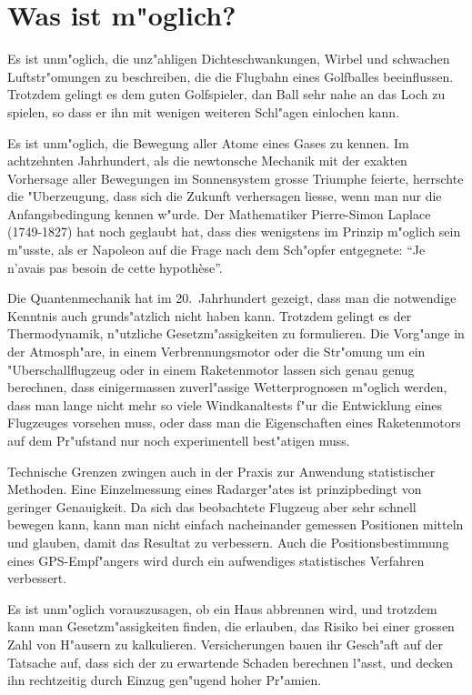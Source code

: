 \section*{Was ist m"oglich?}
Es ist unm"oglich, die unz"ahligen Dichteschwankungen, Wirbel und
schwachen Luftstr"omungen zu beschreiben, die die Flugbahn eines
Golfballes beeinflussen. Trotzdem gelingt es dem guten Golfspieler,
dan Ball sehr nahe an das Loch zu spielen, so dass er ihn mit wenigen
weiteren Schl"agen einlochen kann.

Es ist unm"oglich, die Bewegung aller Atome eines Gases zu kennen.
Im achtzehnten Jahrhundert, als die newtonsche Mechanik mit der
exakten Vorhersage aller Bewegungen im Sonnensystem grosse Triumphe
feierte, herrschte die "Uberzeugung, dass sich die Zukunft verhersagen
liesse, wenn man nur die Anfangsbedingung kennen w"urde.
Der Mathematiker Pierre-Simon Laplace (1749-1827) hat noch geglaubt hat, dass dies
wenigstens im Prinzip m"oglich sein m"usste, als er Napoleon auf die Frage
nach dem Sch"opfer entgegnete: ``Je n'avais pas besoin de cette hypoth\`ese''.

Die Quantenmechanik hat
im 20.~Jahrhundert gezeigt, dass man die notwendige Kenntnis auch
grunds"atzlich nicht haben kann. Trotzdem gelingt es der Thermodynamik,
n"utzliche Gesetzm"assigkeiten zu formulieren. Die
Vorg"ange in der Atmosph"are, in einem Verbrennungsmotor oder die
Str"omung um ein "Uberschallflugzeug oder in einem Raketenmotor
lassen sich genau genug berechnen, dass einigermassen zuverl"assige
Wetterprognosen m"oglich werden, dass man lange nicht mehr so viele
Windkanaltests f"ur die Entwicklung eines Flugzeuges vorsehen muss,
oder dass man die Eigenschaften eines Raketenmotors auf dem
Pr"ufstand nur noch experimentell best"atigen muss.

Technische Grenzen zwingen auch in der Praxis zur Anwendung statistischer
Methoden. Eine Einzelmessung eines Radarger"ates ist prinzipbedingt
von geringer
Genauigkeit. Da sich das beobachtete Flugzeug aber sehr schnell bewegen
kann, kann man nicht einfach nacheinander gemessen Positionen mitteln
und glauben, damit das Resultat zu verbessern. Auch die Positionsbestimmung
eines GPS-Empf"angers wird durch ein aufwendiges statistisches Verfahren
verbessert.

Es ist unm"oglich vorauszusagen, ob ein Haus abbrennen wird, und
trotzdem kann man Gesetzm"assigkeiten finden, die erlauben, das
Risiko bei einer grossen Zahl von H"ausern zu kalkulieren.
Versicherungen bauen ihr Gesch"aft auf der Tatsache auf, dass
sich der zu erwartende Schaden berechnen l"asst, und decken ihn
rechtzeitig durch Einzug gen"ugend hoher Pr"amien.

